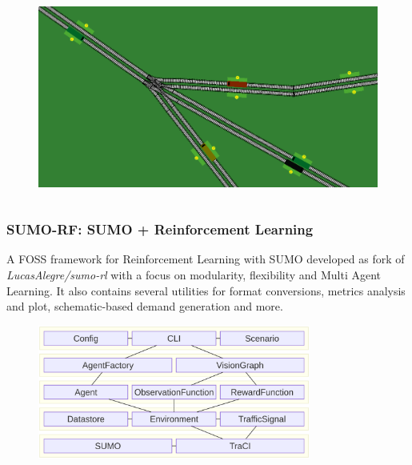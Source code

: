 \documentclass{beamer}
\begin{document}
\begin{frame}
\begin{columns}
\begin{column}{0.6\textwidth}
\begin{figure}
        \centering
        \includegraphics[width=1.0\textwidth]{figures/sumo-example2.png}
      \end{figure}
    \end{column}
  \end{columns}
\end{frame}

\begin{frame}
\frametitle{SUMO-RF: SUMO + Reinforcement Learning}
  A FOSS framework for Reinforcement Learning with SUMO developed as fork of \textit{LucasAlegre/sumo-rl} with a focus on modularity, flexibility and Multi Agent Learning.
  It also contains several utilities for format conversions, metrics analysis and plot, schematic-based demand generation and more.
  \begin{figure}
    \centering
    \includegraphics[width=0.8\textwidth]{figures/sumo-rf-architecture.png}
  \end{figure}
\end{frame}
\end{document}
